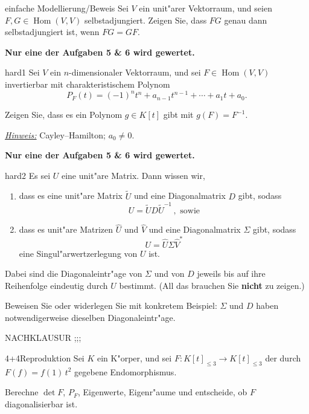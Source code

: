 \documentclass[a4paper]{article}
\DeclareMathOperator{\Hom}{Hom}
\begin{document}
\pagebreak
\begin{klaufg}{8}{einfache Modellierung/Beweis}
  Sei $V$ ein unit"arer Vektorraum, und seien $F,G \in
  \Hom(V,V)$ selbstadjungiert. Zeigen Sie, dass $FG$ genau dann
  selbstadjungiert ist, wenn $FG=GF$.
\end{klaufg}
 
\pagebreak
{\bfseries Nur eine der Aufgaben 5 \& 6 wird gewertet.}
\bigskip
\bigskip

\begin{klaufg}{8}{hard1}
   Sei $V$ ein $n$-dimensionaler Vektorraum, und sei $F \in
   \operatorname{Hom}(V,V)$ invertierbar mit charakteristischem
   Polynom $$P_F(t) = (-1)^n t^n + a_{n-1} t^{n-1} + \cdots + a_1 t +
   a_0 .$$

   Zeigen Sie, dass es ein Polynom $g \in K[t]$ gibt mit $g(F)= F^{-1}$.
   \medskip

   \underline{\emph{Hinweis:}} Cayley--Hamilton; $a_0 \neq 0$.  
\end{klaufg}

\pagebreak
{\bfseries Nur eine der Aufgaben 5 \& 6 wird gewertet.}
\bigskip
\bigskip

\begin{klaufg}{8}{hard2}
  Es sei $U$ eine unit"are Matrix. Dann wissen wir, 
  \begin{enumerate}
  \item dass es eine unit"are Matrix $\tilde{U}$ und eine Diagonalmatrix
    $D$ gibt, sodass
    \[ U = \tilde{U} D \tilde{U}^{-1}\,, \text{ sowie}
    \]
  \item dass
    es unit"are Matrizen $\widehat{U}$ und $\widehat{V}$ und eine
    Diagonalmatrix $\Sigma$ gibt, sodass
    \[ U = \widehat{U} \Sigma \widehat{V}^*
    \]
    eine Singul"arwertzerlegung von $U$ ist.
  \end{enumerate}
  Dabei sind die Diagonaleintr"age von $\Sigma$ und von $D$ jeweils
  bis auf ihre Reihenfolge eindeutig durch $U$ bestimmt. (All das
  brauchen Sie {\bfseries nicht} zu zeigen.)

  Beweisen Sie oder widerlegen Sie mit konkretem Beispiel: $\Sigma$ und
  $D$ haben notwendigerweise dieselben Diagonaleintr"age.
\end{klaufg}



\pagebreak
NACHKLAUSUR ;;;

\begin{klaufg}{4+4}{Reproduktion}
  Sei $K$ ein K"orper, und sei $F \colon K[t]_{\le3} \to K[t]_{\le3}$
  der durch $F(f) = f(1)\,t^2$ gegebene Endomorphismus.

  Berechne $\det F$, $P_F$, Eigenwerte, Eigenr"aume und entscheide, ob
  $F$ diagonalisierbar ist.
  \end{klaufg}
\end{document}
